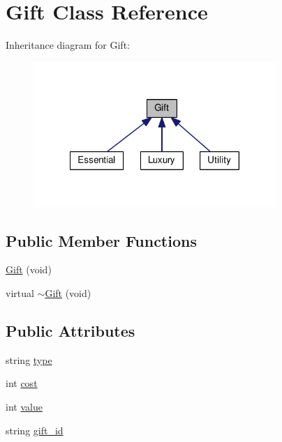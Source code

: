 \hypertarget{class_gift}{\section{Gift Class Reference}
\label{class_gift}
}


Inheritance diagram for Gift\-:
\nopagebreak
\begin{figure}[H]
\begin{center}
\leavevmode
\includegraphics[width=261pt]{class_gift__inherit__graph}
\end{center}
\end{figure}
\subsection*{Public Member Functions}
\begin{DoxyCompactItemize}
\item 
\hyperlink{class_gift_aca2e0626d4322a975ea1c0c998d558ff}{Gift} (void)
\item 
virtual \hyperlink{class_gift_a652c8397a6ee7303377cac42d3f1b4f9}{$\sim$\-Gift} (void)
\end{DoxyCompactItemize}
\subsection*{Public Attributes}
\begin{DoxyCompactItemize}
\item 
string \hyperlink{class_gift_a80ea42010282475cb1c02f3eeba89c41}{type}
\item 
int \hyperlink{class_gift_ad110c98fdaca7cbf83829bbc2a5cfd15}{cost}
\item 
int \hyperlink{class_gift_a71d14b92ebfd06993afe584f088bc748}{value}
\item 
string \hyperlink{class_gift_af84fa1865956d2e86dbba115102559a7}{gift\-\_\-id}
\end{DoxyCompactItemize}


